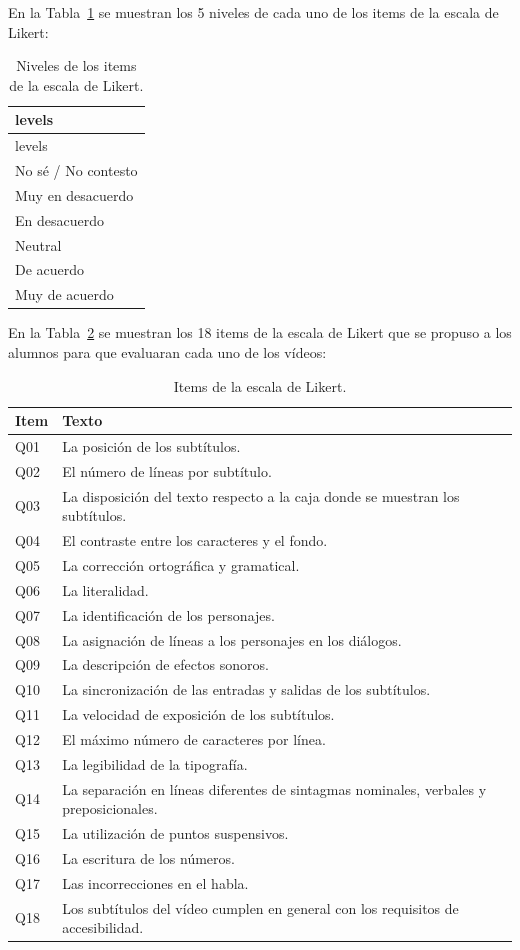 \documentclass[
  12pt,
  a4paper,
  extrafontsizes,
  onecolumn,
  openright]{memoir}
\begin{document}
En la Tabla~\ref{tbl-likert-levels} se muestran los 5 niveles de cada
uno de los items de la escala de Likert:

\clearpage

\hypertarget{tbl-likert-levels}{}
\begin{longtable}[]{@{}l@{}}
\caption{\label{tbl-likert-levels}Niveles de los items de la escala de
Likert.}\tabularnewline
\toprule\noalign{}
levels \\
\midrule\noalign{}
\endfirsthead
\toprule\noalign{}
levels \\
\midrule\noalign{}
\endhead
\bottomrule\noalign{}
\endlastfoot
No sé / No contesto \\
Muy en desacuerdo \\
En desacuerdo \\
Neutral \\
De acuerdo \\
Muy de acuerdo \\
\end{longtable}

En la Tabla~\ref{tbl-likert-scale} se muestran los 18 items de la escala
de Likert que se propuso a los alumnos para que evaluaran cada uno de
los vídeos:

\hypertarget{tbl-likert-scale}{}
\begin{longtable}{ll}
\caption{\label{tbl-likert-scale}Items de la escala de Likert. }\tabularnewline

\toprule
Item & Texto \\ 
\midrule
Q01 & La posición de los subtítulos. \\ 
Q02 & El número de líneas por subtítulo. \\ 
Q03 & La disposición del texto respecto a la caja donde se muestran los subtítulos. \\ 
Q04 & El contraste entre los caracteres y el fondo. \\ 
Q05 & La corrección ortográfica y gramatical. \\ 
Q06 & La literalidad. \\ 
Q07 & La identificación de los personajes. \\ 
Q08 & La asignación de líneas a los personajes en los diálogos. \\ 
Q09 & La descripción de efectos sonoros. \\ 
Q10 & La sincronización de las entradas y salidas de los subtítulos. \\ 
Q11 & La velocidad de exposición de los subtítulos. \\ 
Q12 & El máximo número de caracteres por línea. \\ 
Q13 & La legibilidad de la tipografía. \\ 
Q14 & La separación en líneas diferentes de sintagmas nominales, verbales y preposicionales. \\ 
Q15 & La utilización de puntos suspensivos. \\ 
Q16 & La escritura de los números. \\ 
Q17 & Las incorrecciones en el habla. \\ 
Q18 & Los subtítulos del vídeo cumplen en general con los requisitos de accesibilidad. \\ 
\bottomrule
\end{longtable}
\end{document}
